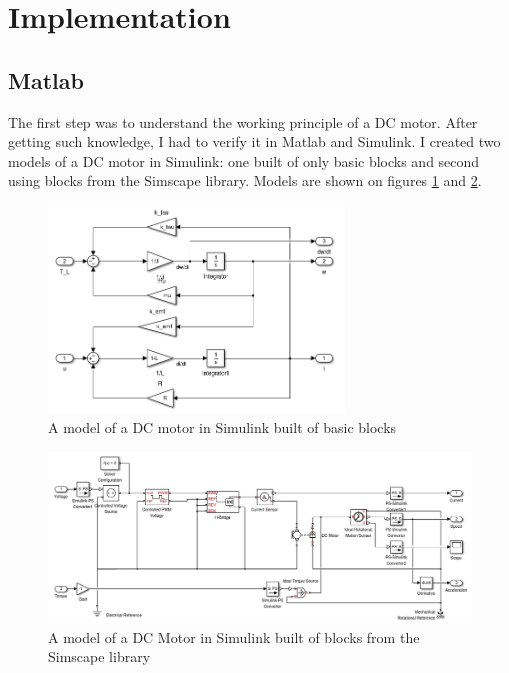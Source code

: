 \section{Implementation}
\subsection{Matlab}
The first step was to understand the working principle of a DC motor. After getting such knowledge, I had to verify it in Matlab and Simulink. I created two models of a DC motor in Simulink: one built of only basic blocks and second using blocks from the Simscape library. Models are shown on figures \ref{fig:basic} and \ref{fig:hbridge}.

\begin{figure}%
 \begin{center} 
  \includegraphics[width=0.7\textwidth]{./stuff/basic_blocks}
 \end{center}
 \caption{A model of a DC motor in Simulink built of basic blocks}
 \label{fig:basic} 
\end{figure}   

\begin{figure}%
 \begin{center} 
  \includegraphics[width=\textwidth]{./stuff/simscape}
 \end{center}
 \caption{A model of a DC Motor in Simulink built of blocks from the Simscape library}
 \label{fig:hbridge} 
\end{figure}   

